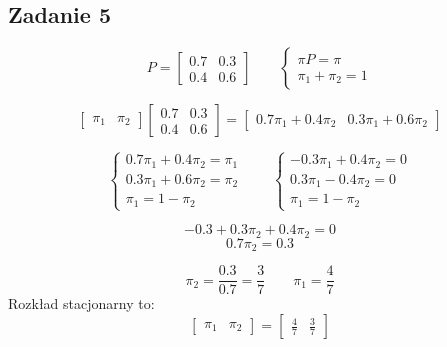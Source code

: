 \subsection{Zadanie 5}

$$
P = 
\left[
\begin{array}{ccc}
0.7 & 0.3  \\
0.4 & 0.6  
\end{array}
\right]
\qquad
\begin{cases} \pi P = \pi \\ \pi_1 + \pi_2 = 1
\end{cases}
$$

$$
\left[
\begin{array}{cc}
\pi_1 & \pi_2
\end{array}
\right]
\left[
\begin{array}{ccc}
0.7 & 0.3  \\
0.4 & 0.6  
\end{array}
\right]
=
\left[
\begin{array}{cc}
0.7\pi_1 + 0.4\pi_2 & 0.3\pi_1 + 0.6\pi_2
\end{array}
\right]
$$

$$
\begin{cases}
0.7\pi_1 + 0.4\pi_2 = \pi_1 \\
0.3\pi_1 + 0.6\pi_2 = \pi_2 \\
\pi_1 = 1 - \pi_2
\end{cases}
\qquad
\begin{cases}
-0.3\pi_1 + 0.4\pi_2 = 0 \\
0.3\pi_1 - 0.4\pi_2 = 0 \\
\pi_1 = 1 - \pi_2
\end{cases}
$$

$$
-0.3 + 0.3\pi_2 + 0.4\pi_2 = 0
$$
$$
0.7\pi_2 = 0.3
$$

$$
\pi_2 = \frac{0.3}{0.7} = \frac{3}{7}
\qquad
\pi_1 = \frac{4}{7}
$$
Rozkład stacjonarny to:
$$
\left[
\begin{array}{cc}
\pi_1 & \pi_2
\end{array}
\right]
=
\left[
\begin{array}{cc}
\frac{4}{7} & \frac{3}{7}
\end{array}
\right]
$$
